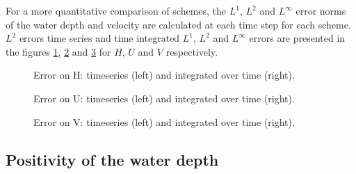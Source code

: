 For a more quantitative comparison of schemes, the $L^1$, $L^2$ and $L^\infty$ error norms 
of the water depth and velocity are calculated at each time step for each scheme. 
$L^2$ errors time series and time integrated $L^1$, $L^2$ and $L^\infty$ errors are presented in the figures \ref{fig:stoker:ErrNumH}, \ref{fig:stoker:ErrNumU} and \ref{fig:stoker:ErrNumV} for $H$, $U$ and $V$ respectively.

\begin{figure}[H]
\begin{minipage}[t]{0.45\textwidth}
 \centering
\end{minipage}%
\begin{minipage}[t]{0.55\textwidth}
 \centering
\end{minipage}
  \caption{Error on H: timeseries (left) and integrated over time (right).}
  \label{fig:stoker:ErrNumH}
\end{figure}

\begin{figure}[H]
\begin{minipage}[t]{0.45\textwidth}
 \centering
\end{minipage}%
\begin{minipage}[t]{0.55\textwidth}
 \centering
\end{minipage}
  \caption{Error on U: timeseries (left) and integrated over time (right).}
  \label{fig:stoker:ErrNumU}
\end{figure}

\begin{figure}[H]
\begin{minipage}[t]{0.45\textwidth}
 \centering
\end{minipage}%
\begin{minipage}[t]{0.55\textwidth}
 \centering
\end{minipage}
  \caption{Error on V: timeseries (left) and integrated over time (right).}
  \label{fig:stoker:ErrNumV}
\end{figure}

\subsection{Positivity of the water depth}

